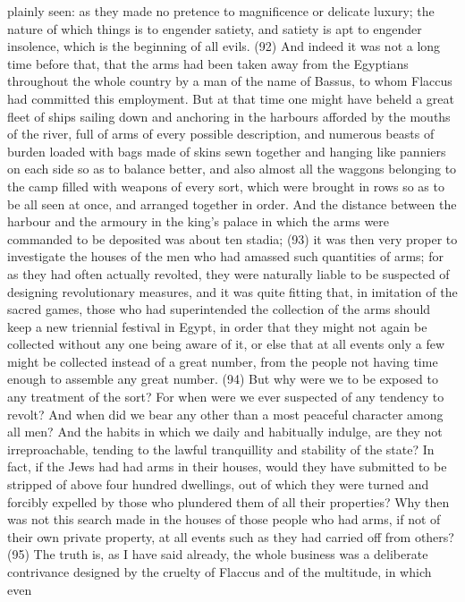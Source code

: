 plainly seen: as they made no pretence to magnificence or delicate luxury; the nature of which
things is to engender satiety, and satiety is apt to engender insolence, which is the beginning of all
evils. (92) And indeed it was not a long time before that, that the arms had been taken away from
the Egyptians throughout the whole country by a man of the name of Bassus, to whom Flaccus had
committed this employment. But at that time one might have beheld a great fleet of ships sailing
down and anchoring in the harbours afforded by the mouths of the river, full of arms of every
possible description, and numerous beasts of burden loaded with bags made of skins sewn
together and hanging like panniers on each side so as to balance better, and also almost all the
waggons belonging to the camp filled with weapons of every sort, which were brought in rows so as
to be all seen at once, and arranged together in order. And the distance between the harbour and
the armoury in the king's palace in which the arms were commanded to be deposited was about ten
stadia; (93) it was then very proper to investigate the houses of the men who had amassed such
quantities of arms; for as they had often actually revolted, they were naturally liable to be
suspected of designing revolutionary measures, and it was quite fitting that, in imitation of the
sacred games, those who had superintended the collection of the arms should keep a new triennial
festival in Egypt, in order that they might not again be collected without any one being aware of it, or
else that at all events only a few might be collected instead of a great number, from the people not
having time enough to assemble any great number. (94) But why were we to be exposed to any
treatment of the sort? For when were we ever suspected of any tendency to revolt? And when did
we bear any other than a most peaceful character among all men? And the habits in which we daily
and habitually indulge, are they not irreproachable, tending to the lawful tranquillity and stability of
the state? In fact, if the Jews had had arms in their houses, would they have submitted to be
stripped of above four hundred dwellings, out of which they were turned and forcibly expelled by
those who plundered them of all their properties? Why then was not this search made in the
houses of those people who had arms, if not of their own private property, at all events such as
they had carried off from others? (95) The truth is, as I have said already, the whole business was
a deliberate contrivance designed by the cruelty of Flaccus and of the multitude, in which even
